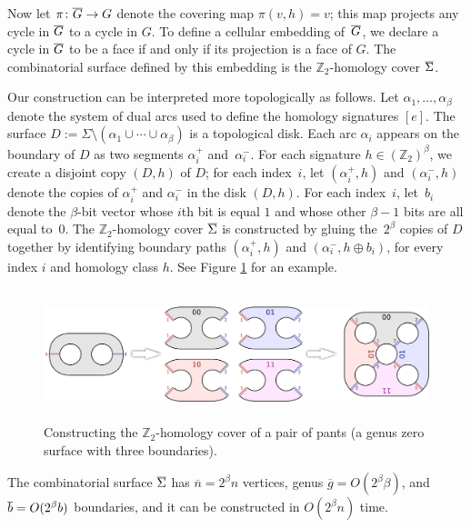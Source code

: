 \documentclass[letterpaper,review]{siamart190516}
\def\Z{\mathbb{Z}}
\def\dualarc{\alpha}
\def\Sigmabar{\overline{\smash{\Sigma}\vphantom{t}}}
\def\Gbar{\overline{\smash{G}\vphantom{t}}}
\def\bbar{\overline{\smash{b}\vphantom{t}}}
\def\nbar{\overline{n}}
\def\gbar{\overline{g}}
\begin{document}
Now let $\pi\colon \Gbar\to G$ denote the covering map $\pi(v, h) = v$; this map projects any cycle in $\Gbar$ to a cycle in $G$.  To define a cellular embedding of~$\Gbar$, we declare a cycle in $\Gbar$ to be a face if and only if its projection is a face of $G$.  The combinatorial surface defined by this embedding is the $\Z_2$-homology cover $\Sigmabar$.

Our construction can be interpreted more topologically as follows.  Let $\dualarc_1, \dots, \dualarc_\beta$ denote the system of dual arcs used to define the homology signatures $[e]$.  The surface $D := \Sigma\setminus(\dualarc_1\cup\cdots\cup \dualarc_\beta)$ is a topological disk.  Each arc $\dualarc_i$ appears on the boundary of $D$ as two segments $\dualarc^+_i$ and~$\dualarc^-_i$.  For each signature $h\in (\Z_2)^\beta$, we create a disjoint copy $(D,h)$ of $D$; for each index~$i$, let $(\dualarc^+_i, h)$ and $(\dualarc^-_i, h)$ denote the copies of $\dualarc^+_i$ and $\dualarc^-_i$ in the disk $(D, h)$.  For each index~$i$, let~$b_i$ denote the $\beta$-bit vector whose $i$th bit is equal $1$ and whose other $\beta-1$ bits are all equal to~$0$.  The $\Z_2$-homology cover $\Sigmabar$ is constructed by gluing the~$2^\beta$ copies of $D$ together by identifying boundary paths $(\dualarc^+_i,h)$ and $(\dualarc^-_i, h\oplus b_i)$, for every index $i$ and homology class $h$.  See Figure \ref{fig:cover-ex} for an example.

\begin{figure}
\centering
\includegraphics[height=1.5in]{Fig/hom-cover-example}
\caption{Constructing the $\Z_2$-homology cover of a pair of pants (a genus zero surface with three boundaries).}
\label{fig:cover-ex}
\end{figure}

\begin{lemma}
\label{lem:cover-cxy}
The combinatorial surface $\Sigmabar$ has $\nbar = 2^\beta n$ vertices, genus $\gbar = O(2^\beta \beta)$, and $\bbar = O(2^\beta b)$ boundaries, and it can be constructed in $O(2^\beta n)$ time.
\end{lemma}
\end{document}

